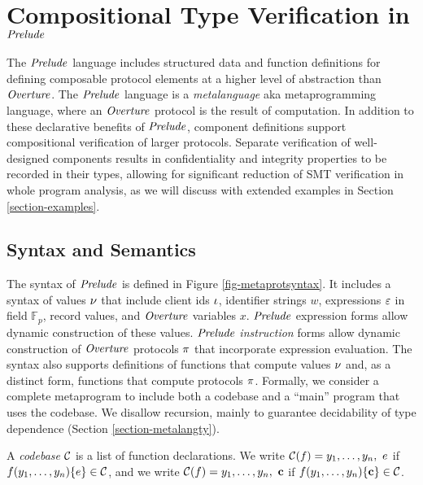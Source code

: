 \section{Compositional Type Verification in $\mathit{Prelude}$}
\label{section-metalang}

The $\mathit{Prelude}$ language \cite{skalka-near-ppdp24} includes structured
data and function definitions for defining composable protocol
elements at a higher level of abstraction than $\mathit{Overture}$.  The
$\mathit{Prelude}$ language is a \emph{metalanguage} aka metaprogramming
language, where an $\mathit{Overture}$ protocol is the result of
computation. In addition to these declarative benefits of $\mathit{Prelude}$,
component definitions support compositional verification of larger
protocols. Separate verification of well-designed components results
in confidentiality and integrity properties to be recorded in their
types, allowing for significant reduction of SMT verification in whole
program analysis, as we will discuss with extended examples in Section
\ref{section-examples}.

\metaprotsyntaxfig

\subsection{Syntax and Semantics}

The syntax of $\mathit{Prelude}$ is defined in Figure
\ref{fig-metaprotsyntax}.  It includes a syntax of values $\nu$ that
include client ids $\iota$, identifier strings $w$, expressions $\varepsilon$
in field $\mathbb{F}_p$, record values, and $\mathit{Overture}$ variables
$x$. $\mathit{Prelude}$ expression forms allow dynamic construction of these
values. $\mathit{Prelude}$ \emph{instruction} forms allow dynamic
construction of $\mathit{Overture}$ protocols $\pi$ that incorporate expression
evaluation. The syntax also supports definitions of functions that
compute values $\nu$ and, as a distinct form, functions that compute
protocols $\pi$.  Formally, we consider a complete metaprogram to include
both a codebase and a ``main'' program that uses the codebase.
We disallow recursion, mainly to guarantee decidability
of type dependence (Section \ref{section-metalangty}).
\begin{definition}
A \emph{codebase} $\mathcal{C}$ is a list of function 
declarations. We write $ \mathcal{C}(f) = y_1,\ldots,y_n,\ e$
if $f(y_1,\ldots,y_n) \{ e \} \in \mathcal{C}$, and we
write  $ \codebase(f) = y_1,\ldots,y_n,\ \instr$
if $f(y_1,\ldots,y_n) \{ \mathbf{c} \} \in \mathcal{C}$.
\end{definition}

